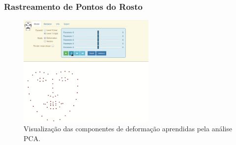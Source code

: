 \documentclass[brazil]{beamer}
\begin{document}
\begin{frame}
\frametitle{Rastreamento de Pontos do Rosto}
      \begin{figure}
          \centering
          \includegraphics[width = 0.6\textwidth, keepaspectratio]{./img/pca_exaplained.png}
          \caption{Visualização das componentes de deformação aprendidas pela análise PCA.}
      \end{figure}
\end{frame}
\end{document}
